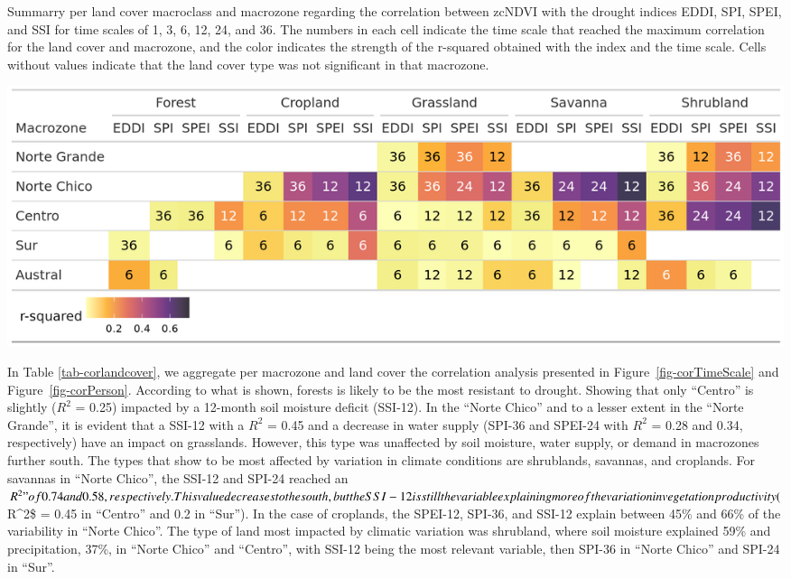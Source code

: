 \documentclass[
  authoryear,
  preprint,
  3p,
  onecolumn]{elsarticle}
\begin{document}
\begin{table}[!ht]
\caption{Summarry per land cover macroclass and macrozone regarding the correlation between zcNDVI with the drought indices EDDI, SPI, SPEI, and SSI for time scales of 1, 3, 6, 12, 24, and 36. The numbers in each cell indicate the time scale that reached the maximum correlation for the land cover and macrozone, and the color indicates the strength of the r-squared obtained with the index and the time scale. Cells without values indicate that the land cover type was not significant in that macrozone.}
\label{tab-corlandcover}
\includegraphics[]{../output/figs/tabla_r_cor_macro_indice.png}
\end{table}

In Table \ref{tab-corlandcover}, we aggregate per macrozone and land
cover the correlation analysis presented in
Figure~\ref{fig-corTimeScale} and Figure~\ref{fig-corPerson}. According
to what is shown, forests is likely to be the most resistant to drought.
Showing that only ``Centro'' is slightly (\(R^2\) = 0.25) impacted by a
12-month soil moisture deficit (SSI-12). In the ``Norte Chico'' and to a
lesser extent in the ``Norte Grande'', it is evident that a SSI-12 with
a \(R^2\) = 0.45 and a decrease in water supply (SPI-36 and SPEI-24 with
\(R^2\) = 0.28 and 0.34, respectively) have an impact on grasslands.
However, this type was unaffected by soil moisture, water supply, or
demand in macrozones further south. The types that show to be most
affected by variation in climate conditions are shrublands, savannas,
and croplands. For savannas in ``Norte Chico'', the SSI-12 and SPI-24
reached an
\(R^2" of 0.74 and 0.58, respectively. This value decreases to the south, but the SSI-12 is still the variable explaining more of the variation in vegetation productivity (\)R\^{}2\$
= 0.45 in ``Centro'' and 0.2 in ``Sur''). In the case of croplands, the
SPEI-12, SPI-36, and SSI-12 explain between 45\% and 66\% of the
variability in ``Norte Chico''. The type of land most impacted by
climatic variation was shrubland, where soil moisture explained 59\% and
precipitation, 37\%, in ``Norte Chico'' and ``Centro'', with SSI-12
being the most relevant variable, then SPI-36 in ``Norte Chico'' and
SPI-24 in ``Sur''.
\end{document}
